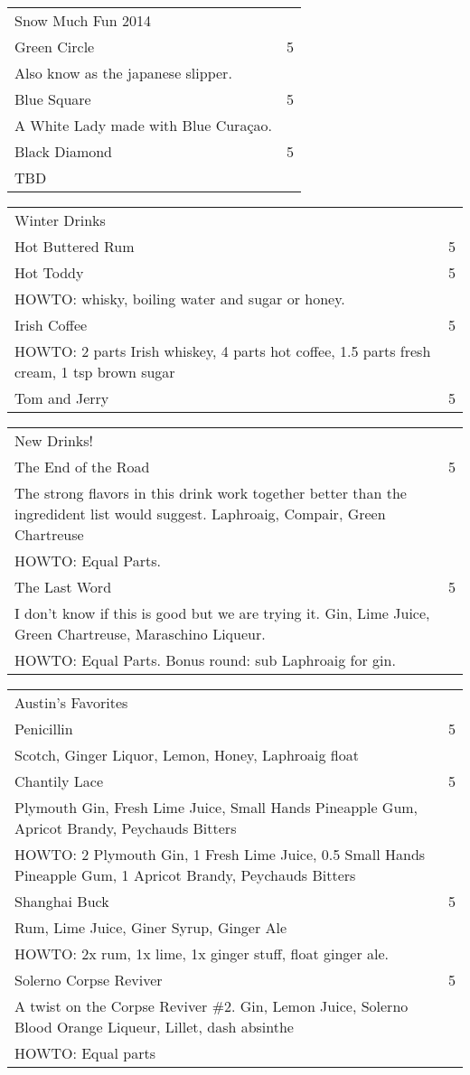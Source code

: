 \documentclass[12pt]{article}
\makeatletter
\newcommand*\ColText[1]{\textcolor{Goldenrod3}{#1}}
\newenvironment{Group}[1]
  {\noindent\begin{tabular*}{\textwidth}{@{}p{.8\linewidth}@{\extracolsep{\fill}}r@{}}
    {\fontsize{24}{29}\selectfont\ColText{#1}}\\[0.8em]}
  {\end{tabular*}}
\newcommand*\Entry[1]{%
  \sffamily#1 & 5 \\
}
\newcommand*\Expl[1]{
  \hspace*{1em}\footnotesize #1 \\
}
\newcommand*\HowTo[1]{
  HOWTO: \hspace*{1em}\footnotesize #1 \\
}
\makeatother
\begin{document}
\begin{Group}{Snow Much Fun 2014}

\Entry{Green Circle}
\Expl{Also know as the japanese slipper.}

\Entry{Blue Square}
\Expl{A White Lady made with Blue Curaçao.}

\Entry{Black Diamond}
\Expl{TBD}

\end{Group}

\vfill

\begin{Group}{Winter Drinks}
\Entry{Hot Buttered Rum}

\Entry{Hot Toddy}
\HowTo{ whisky, boiling water and sugar or honey.}

\Entry{Irish Coffee}
\HowTo{2 parts Irish whiskey, 4 parts hot coffee, 1.5 parts fresh cream, 1 tsp brown sugar}

\Entry{Tom and Jerry}
\end{Group}

\vfill

\begin{Group}{New Drinks!}

\Entry{The End of the Road}
\Expl{The strong flavors in this drink work together better than the ingredident list would suggest. Laphroaig, Compair, Green Chartreuse}
\HowTo{Equal Parts.}

\Entry{The Last Word}
\Expl{I don't know if this is good but we are trying it. Gin, Lime Juice, Green Chartreuse, Maraschino Liqueur.}
\HowTo{Equal Parts. Bonus round: sub Laphroaig for gin.}

\end{Group}

\vfill

\begin{Group}{Austin's Favorites}

\Entry{Penicillin}
\Expl{Scotch, Ginger Liquor, Lemon, Honey, Laphroaig float}

\Entry{Chantily Lace}
\Expl{Plymouth Gin, Fresh Lime Juice, Small Hands Pineapple Gum, Apricot Brandy, Peychauds Bitters}
\HowTo{2 Plymouth Gin, 1 Fresh Lime Juice, 0.5 Small Hands Pineapple Gum, 1 Apricot Brandy, Peychauds Bitters}

\Entry{Shanghai Buck}
\Expl{Rum, Lime Juice, Giner Syrup, Ginger Ale}
\HowTo{2x rum, 1x lime, 1x ginger stuff, float ginger ale.}

\Entry{Solerno Corpse Reviver}
\Expl{A twist on the Corpse Reviver \#2. Gin, Lemon Juice, Solerno Blood Orange Liqueur, Lillet, dash absinthe}
\HowTo{Equal parts}

\end{Group}
\end{document}
